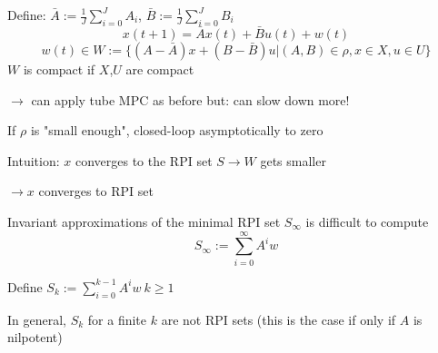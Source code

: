 Define: $\bar{A} := \frac{1}{J}\sum_{i=0}^{J}A_i$, $\bar{B} := \frac{1}{J}\sum_{i=0}^{J}B_i$
\begin{equation*}
x(t+1) = \bar{A}x(t) + \bar{B}u(t) + w(t)
\end{equation*}
\begin{equation*}
w(t) \in W := \{(A-\bar{A})x + (B-\bar{B})u | (A,B) \in \rho, x \in X, u \in U \}
\end{equation*}
$W$ is compact if $X$,$U$ are compact

$\rightarrow$ can apply tube MPC as before
but: can slow down more!

If $\rho$ is "small enough", closed-loop asymptotically to zero

Intuition: $x$ converges to the RPI set $S \rightarrow W$ gets smaller 

$\rightarrow x$ converges to RPI set

Invariant approximations of the minimal RPI set $S_{\infty}$ is difficult to compute
\begin{equation*}
S_{\infty} := \sum_{i=0}^{\infty}A^iw
\end{equation*}

Define $S_k := \sum_{i=0}^{k-1}A^iw \ k \geq 1$

In general, $S_k$ for a finite $k$ are not RPI sets (this is the case if only if $A$ is nilpotent)

